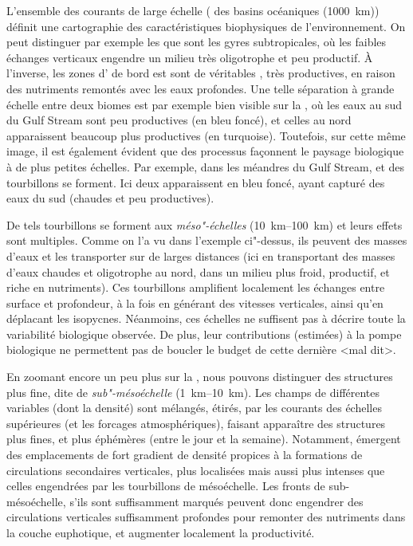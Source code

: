 L'ensemble des courants de large échelle ( des basins océaniques \OM(\qty{1000}{\km})) définit une cartographie des caractéristiques biophysiques de l'environnement.
On peut distinguer par exemple les  que sont les gyres subtropicales, où les faibles échanges verticaux engendre un milieu très oligotrophe et peu productif.
À l'inverse, les zones d' de bord est sont de véritables , très productives, en raison des nutriments remontés avec les eaux profondes.
Une telle séparation à grande échelle entre deux biomes est par exemple bien visible sur la , où les eaux au sud du Gulf Stream sont peu productives (en bleu foncé), et celles au nord apparaissent beaucoup plus productives (en turquoise).
Toutefois, sur cette même image, il est également évident que des processus façonnent le paysage biologique à de plus petites échelles.
Par exemple, dans les méandres du Gulf Stream, et des tourbillons se forment.
Ici deux apparaissent en bleu foncé, ayant capturé des eaux du sud (chaudes et peu productives).

De tels tourbillons se forment aux \emph{méso"-échelles} (\qtyrange{10}{100}{\km}) et leurs effets sont multiples.
Comme on l'a vu dans l'exemple ci"-dessus, ils peuvent  des masses d'eaux et les transporter sur de larges distances (ici en transportant des masses d'eaux chaudes et oligotrophe au nord,  dans un milieu plus froid, productif, et riche en nutriments).
Ces tourbillons amplifient localement les échanges entre surface et profondeur, à la fois en générant des vitesses verticales, ainsi qu'en déplacant les isopycnes.
Néanmoins, ces échelles ne suffisent pas à décrire toute la variabilité biologique observée. De plus, leur contributions (estimées) à la pompe biologique ne permettent pas de boucler le budget de cette dernière <mal dit>.

En zoomant encore un peu plus sur la , nous pouvons distinguer des structures plus fine, dite de \emph{sub"-mésoéchelle} (\qtyrange{1}{10}{\km}).
Les champs de différentes variables (dont la densité) sont mélangés, étirés, par les courants des échelles supérieures (et les forcages atmosphériques), faisant apparaître des structures plus fines, et plus éphémères (entre le jour et la semaine).
Notamment, émergent des emplacements de fort gradient  de densité propices à la formations de circulations secondaires verticales, plus localisées mais aussi plus intenses que celles engendrées par les tourbillons de mésoéchelle.
Les fronts de sub-mésoéchelle, s'ils sont suffisamment marqués peuvent donc engendrer des circulations verticales suffisamment profondes pour remonter des nutriments dans la couche euphotique, et augmenter localement la productivité.

